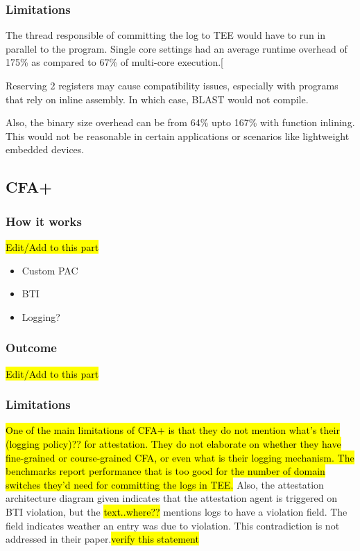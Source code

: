 \documentclass[a4paper, nobind]{templates/ociamthesis}
\providecommand{\tightlist}{%
  \setlength{\itemsep}{0pt}\setlength{\parskip}{0pt}}
\begin{document}
\subsubsection{Limitations}\label{limitations}

The thread responsible of committing the log to TEE would have to run in parallel
to the program. Single core settings had an average runtime overhead of 175\%
as compared to 67\% of multi-core execution.{[}\citeproc{ref-blast}{26}{]}

Reserving 2 registers may cause compatibility issues, especially with programs
that rely on inline assembly. In which case, BLAST would not compile.

Also, the binary size overhead can be from 64\% upto 167\% with function inlining.
This would not be reasonable in certain applications or scenarios like lightweight embedded devices.

\subsection{CFA+}\label{cfa-1}

\subsubsection{How it works}\label{how-it-works-1}

\hl{Edit/Add to this part}

\begin{itemize}
\tightlist
\item
  Custom PAC
\item
  BTI
\item
  Logging?
\end{itemize}

\subsubsection{Outcome}\label{outcome-1}

\hl{Edit/Add to this part}

\subsubsection{Limitations}\label{limitations-1}

\hl{One of the main limitations of CFA+ is that they do not mention what's their
(logging policy)?? for attestation. They do not elaborate on whether they have
fine-grained or course-grained CFA, or even what is their logging mechanism.
The benchmarks report performance that is too good for the number of domain
switches they'd need for committing the logs in TEE.}
Also, the attestation architecture diagram given indicates that the attestation
agent is triggered on BTI violation, but the \hl{text..where??}
mentions logs to have a violation field. The field indicates weather an entry was due to violation.
This contradiction is not addressed in their paper.\hl{verify this statement}
\end{document}
